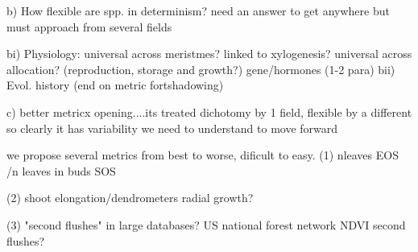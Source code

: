 \documentclass{article}
\begin{document}
	b) How flexible are spp. in determinism?
	need an answer to get anywhere but must approach from several fields
	
	bi) Physiology: universal across meristmes? linked to xylogenesis?
	universal across allocation? (reproduction, storage and growth?)
	gene/hormones (1-2 para)
	bii) Evol. history (end on metric fortshadowing)
	
	c) better metricx
	opening....its treated dichotomy by 1 field, flexible by a different so clearly it has variability we need to understand to move forward
	
	we propose several metrics from best to worse, dificult to easy.
	(1) nleaves  EOS /n leaves in buds SOS
	
	(2) shoot elongation/dendrometers radial growth? 
	
	(3) "second flushes" in large databases? US national forest network 
	NDVI second flushes?
	
	


	
	

	
	\pagebreak
	

	

	

	
	\newpage
	
	
	
	
	
	
\end{document}
